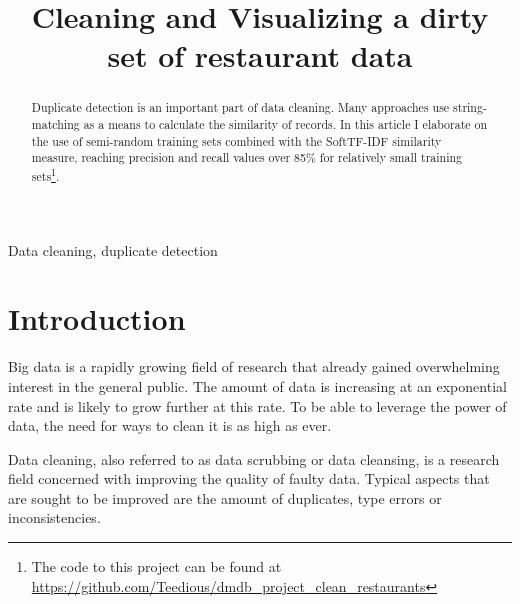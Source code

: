 \documentclass[conference]{IEEEtran}
\begin{document}
\title{Cleaning and Visualizing a dirty set of restaurant data}


\author{
}

\maketitle

\begin{abstract}
Duplicate detection is an important part of data cleaning. Many approaches use string-matching as a means to calculate the similarity of records. In this article I elaborate on the use of semi-random training sets combined with the SoftTF-IDF similarity measure, reaching precision and recall values over 85\% for relatively small training sets\footnote{The code to this project can be found at \url{https://github.com/Teedious/dmdb_project_clean_restaurants}}.
\end{abstract}

\begin{IEEEkeywords}
Data cleaning, duplicate detection
\end{IEEEkeywords}

\section{Introduction}
Big data is a rapidly growing field of research that already gained overwhelming interest in the general public. The amount of data is increasing at an exponential rate and is likely to grow further at this rate. To be able to leverage the power of data, the need for ways to clean it is as high as ever.

Data cleaning, also referred to as data scrubbing or data cleansing, is a research field concerned with improving the quality of faulty data. Typical aspects that are sought to be improved are the amount of duplicates, type errors or inconsistencies\cite{Bilenko.2003}.
\end{document}
